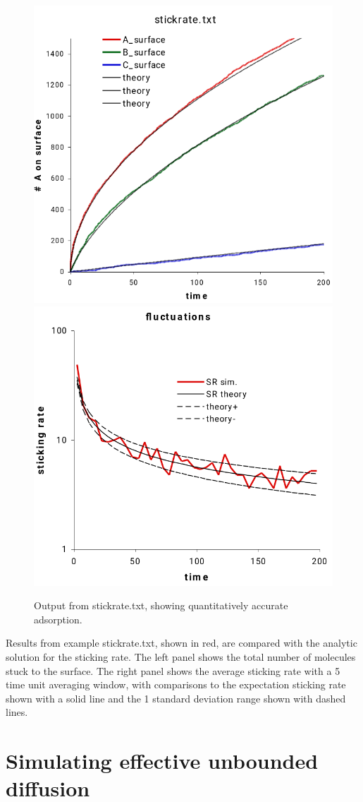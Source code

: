 \documentclass {scrbook}
\begin{document}
\begin{figure}[h]
\centering
\includegraphics[height=5 cm]{figures/image21.png}
\includegraphics[height=5 cm]{figures/image22.png}
\caption{Output from stickrate.txt, showing quantitatively accurate adsorption.}
\label{fig:stickrate}
\end{figure}

Results from example stickrate.txt, shown in red, are compared with the analytic solution for the sticking rate. The left panel shows the total number of molecules stuck to the surface. The right panel shows the average sticking rate with a 5 time unit averaging window, with comparisons to the expectation sticking rate shown with a solid line and the 1 standard deviation range shown with dashed lines.

\section{Simulating effective unbounded diffusion}
\end{document}
